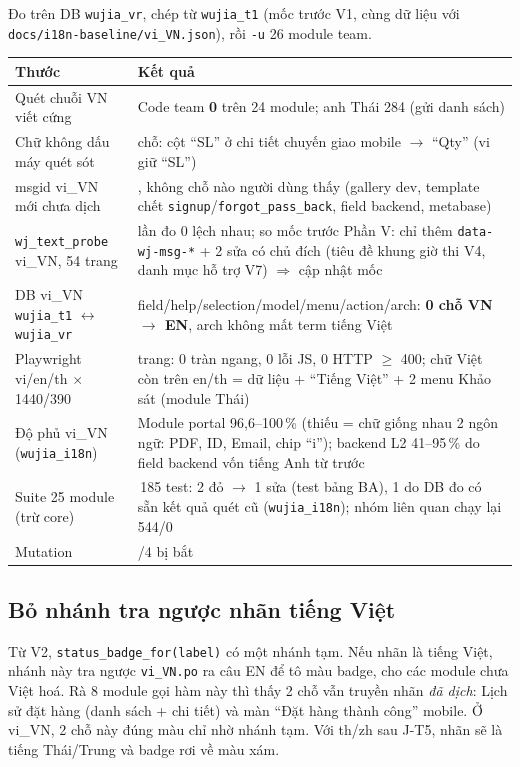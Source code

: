 Đo trên DB \texttt{wujia\_vr}, chép từ \texttt{wujia\_t1} (mốc trước V1, cùng dữ liệu với \texttt{docs/i18n-baseline/vi\_VN.json}),
rồi \texttt{-u} 26 module team.

\begin{center}
\footnotesize
\begin{tabularx}{\textwidth}{>{\raggedright\arraybackslash}p{4.2cm}>{\raggedright\arraybackslash}X}
\toprule
Thước & Kết quả \\
\midrule
Quét chuỗi VN viết cứng & Code team \textbf{0} trên 24 module; anh Thái 284 (gửi danh sách) \\
Chữ không dấu máy quét sót & 1 chỗ: cột ``SL'' ở chi tiết chuyến giao mobile $\to$ ``Qty'' (vi giữ ``SL'') \\
msgid vi\_VN mới chưa dịch & 83, không chỗ nào người dùng thấy (gallery dev, template chết \texttt{signup}/\texttt{forgot\_pass\_back}, field backend, metabase) \\
\texttt{wj\_text\_probe} vi\_VN, 54 trang & 2 lần đo 0 lệch nhau; so mốc trước Phần V: chỉ thêm \texttt{data-wj-msg-*} + 2 sửa có chủ đích (tiêu đề khung giờ thi V4, danh mục hỗ trợ V7) $\Rightarrow$ cập nhật mốc \\
DB vi\_VN \texttt{wujia\_t1} $\leftrightarrow$ \texttt{wujia\_vr} & field/help/selection/model/menu/action/arch: \textbf{0 chỗ VN $\to$ EN}, arch không mất term tiếng Việt \\
Playwright vi/en/th $\times$ 1440/390 & 156 trang: 0 tràn ngang, 0 lỗi JS, 0 HTTP $\geq$ 400; chữ Việt còn trên en/th = dữ liệu + ``Tiếng Việt'' + 2 menu Khảo sát (module Thái) \\
Độ phủ vi\_VN (\texttt{wujia\_i18n}) & Module portal 96,6--100\,\% (thiếu = chữ giống nhau 2 ngôn ngữ: PDF, ID, Email, chip ``i''); backend L2 41--95\,\% do field backend vốn tiếng Anh từ trước \\
Suite 25 module (trừ core) & 1\,185 test: 2 đỏ $\to$ 1 sửa (test bảng BA), 1 do DB đo có sẵn kết quả quét cũ (\texttt{wujia\_i18n}); nhóm liên quan chạy lại 544/0 \\
Mutation & 4/4 bị bắt \\
\bottomrule
\end{tabularx}
\end{center}

\subsection{Bỏ nhánh tra ngược nhãn tiếng Việt}

Từ V2, \texttt{status\_badge\_for(label)} có một nhánh tạm. Nếu nhãn là tiếng Việt, nhánh này tra ngược \texttt{vi\_VN.po} ra câu EN
để tô màu badge, cho các module chưa Việt hoá. Rà 8 module gọi hàm này thì thấy 2 chỗ vẫn truyền nhãn \emph{đã dịch}: Lịch sử đặt
hàng (danh sách + chi tiết) và màn ``Đặt hàng thành công'' mobile. Ở vi\_VN, 2 chỗ này đúng màu chỉ nhờ nhánh tạm. Với th/zh sau
J-T5, nhãn sẽ là tiếng Thái/Trung và badge rơi về màu xám.

